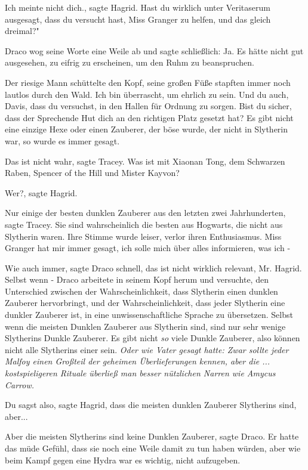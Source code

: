 \glqq Ich meinte nicht dich.\grqq{}, sagte Hagrid. \glqq Hast du wirklich unter
Veritaserum ausgesagt, dass du versucht hast, Miss Granger zu helfen, und
das gleich dreimal?"

Draco wog seine Worte eine Weile ab und sagte schließlich: \glqq Ja.\grqq{} Es
hätte nicht gut ausgesehen, zu eifrig zu erscheinen, um den Ruhm zu
beanspruchen.

Der riesige Mann schüttelte den Kopf, seine großen Füße stapften immer noch
lautlos durch den Wald. \glqq Ich bin überrascht, um ehrlich zu sein. Und
du auch, Davis, dass du versuchst, in den Hallen für Ordnung zu sorgen.
Bist du sicher, dass der Sprechende Hut dich an den richtigen Platz
gesetzt hat? Es gibt nicht eine einzige Hexe oder einen Zauberer, der
böse wurde, der nicht in Slytherin war, so wurde es immer gesagt.\grqq{}

\glqq Das ist nicht wahr\grqq{}, sagte Tracey. \glqq Was ist mit Xiaonan Tong,
dem Schwarzen Raben, Spencer of the Hill und Mister Kayvon?\grqq{}

\glqq Wer?\grqq{}, sagte Hagrid.

\glqq Nur einige der besten dunklen Zauberer aus den letzten zwei
Jahrhunderten\grqq{}, sagte Tracey. \glqq Sie sind wahrscheinlich die
besten aus Hogwarts, die nicht aus Slytherin waren.\grqq{} Ihre Stimme
wurde leiser, verlor ihren Enthusiasmus. \glqq Miss Granger hat mir immer
gesagt, ich solle mich über alles informieren, was ich -\grqq{}

\glqq Wie auch immer\grqq{}, sagte Draco schnell, \glqq das ist nicht wirklich
relevant, Mr. Hagrid. Selbst wenn -\grqq{} Draco arbeitete in seinem Kopf
herum und versuchte, den Unterschied zwischen der Wahrscheinlichkeit,
dass Slytherin einen dunklen Zauberer hervorbringt, und der
Wahrscheinlichkeit, dass jeder Slytherin eine dunkler Zauberer ist, in
eine unwissenschaftliche Sprache zu übersetzen. \glqq Selbst wenn die
meisten Dunklen Zauberer aus Slytherin sind, sind nur sehr wenige
Slytherins Dunkle Zauberer. Es gibt nicht \emph{so} viele Dunkle
Zauberer, also können nicht alle Slytherins einer sein.\grqq{} \emph{Oder
wie Vater gesagt hatte: Zwar sollte jeder Malfoy einen Großteil der
geheimen Überlieferungen kennen, aber die ... kostspieligeren Rituale
überließ man besser nützlichen Narren wie Amycus Carrow. }

\glqq Du sagst also\grqq{}, sagte Hagrid, \glqq dass die meisten dunklen
Zauberer Slytherins sind, aber...\grqq{}

\glqq Aber die meisten Slytherins sind keine Dunklen Zauberer\grqq{}, sagte
Draco. Er hatte das müde Gefühl, dass sie noch eine Weile damit zu tun
haben würden, aber wie beim Kampf gegen eine Hydra war es wichtig, nicht
aufzugeben.

